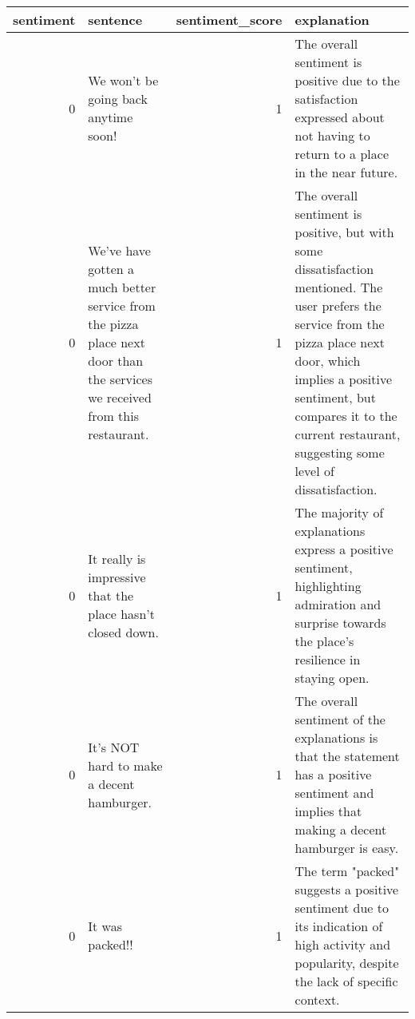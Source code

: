 \begin{tabular}{r{1cm} p{0.4in} r{1cm} p{0.4in}}
\toprule
sentiment & sentence & sentiment_score & explanation \\
\midrule
0 & We won't be going back anytime soon! & 1 & The overall sentiment is positive due to the satisfaction expressed about not having to return to a place in the near future. \\
0 & We've have gotten a much better service from the pizza place next door than the services we received from this restaurant. & 1 & The overall sentiment is positive, but with some dissatisfaction mentioned. The user prefers the service from the pizza place next door, which implies a positive sentiment, but compares it to the current restaurant, suggesting some level of dissatisfaction. \\
0 & It really is impressive that the place hasn't closed down. & 1 & The majority of explanations express a positive sentiment, highlighting admiration and surprise towards the place's resilience in staying open. \\
0 & It's NOT hard to make a decent hamburger. & 1 & The overall sentiment of the explanations is that the statement has a positive sentiment and implies that making a decent hamburger is easy. \\
0 & It was packed!! & 1 & The term "packed" suggests a positive sentiment due to its indication of high activity and popularity, despite the lack of specific context. \\
\bottomrule
\end{tabular}
